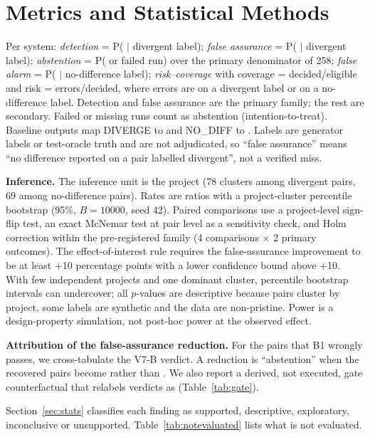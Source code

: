 \section{Metrics and Statistical Methods}\label{sec:metrics}
Per system: \emph{detection} = P(\DIV{} $\mid$ divergent label); \emph{false assurance} = P(\NDO{} $\mid$ divergent label); \emph{abstention} = P(\INS{} or failed run) over the primary denominator of 258; \emph{false alarm} = P(\DIV{} $\mid$ no-difference label); \emph{risk--coverage} with coverage = decided/eligible and risk = errors/decided, where errors are \NDO{} on a divergent label or \DIV{} on a no-difference label. Detection and false assurance are the primary family; the rest are secondary. Failed or missing runs count as abstention (intention-to-treat). Baseline outputs map DIVERGE to \DIV{} and NO\_DIFF to \NDO{}. Labels are generator labels or test-oracle truth and are not adjudicated, so ``false assurance'' means ``no difference reported on a pair labelled divergent'', not a verified miss.

\textbf{Inference.} The inference unit is the project (78 clusters among divergent pairs, 69 among no-difference pairs). Rates are ratios with a project-cluster percentile bootstrap (95\%, $B=10000$, seed 42). Paired comparisons use a project-level sign-flip test, an exact McNemar test at pair level as a sensitivity check, and Holm correction within the pre-registered family (4 comparisons $\times$ 2 primary outcomes). The effect-of-interest rule requires the false-assurance improvement to be at least +10 percentage points with a lower confidence bound above +10. With few independent projects and one dominant cluster, percentile bootstrap intervals can undercover; all $p$-values are descriptive because pairs cluster by project, some labels are synthetic and the data are non-pristine. Power is a design-property simulation, not post-hoc power at the observed effect.

\textbf{Attribution of the false-assurance reduction.} For the pairs that B1 wrongly passes, we cross-tabulate the V7-B verdict. A reduction is ``abstention'' when the recovered pairs become \INS{} rather than \DIV{}. We also report a derived, not executed, gate counterfactual that relabels \INS{} verdicts as \NDO{} (Table~\ref{tab:gate}).

Section~\ref{sec:stats} classifies each finding as supported, descriptive, exploratory, inconclusive or unsupported. Table~\ref{tab:notevaluated} lists what is not evaluated.

